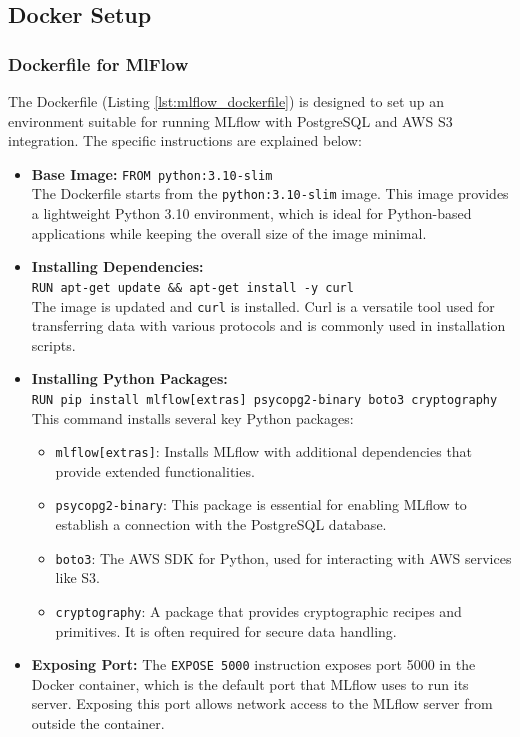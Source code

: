 \subsection{Docker Setup}
\subsubsection{Dockerfile for MlFlow}
The Dockerfile (Listing \ref{lst:mlflow_dockerfile}) is designed to set up an environment suitable for running MLflow with PostgreSQL and AWS S3 integration. The specific instructions are explained below:

\begin{itemize}
    \item \textbf{Base Image:} \verb|FROM python:3.10-slim| \\
    The Dockerfile starts from the \verb|python:3.10-slim| image. This image provides a lightweight Python 3.10 environment, which is ideal for Python-based applications while keeping the overall size of the image minimal.

    \item \textbf{Installing Dependencies:} \\
    \verb|RUN apt-get update && apt-get install -y curl| \\
    The image is updated and \verb|curl| is installed. Curl is a versatile tool used for transferring data with various protocols and is commonly used in installation scripts.

    \item \textbf{Installing Python Packages:} \\
    \verb|RUN pip install mlflow[extras] psycopg2-binary boto3 cryptography| \\
    This command installs several key Python packages:
    \begin{itemize}
        \item \verb|mlflow[extras]|: Installs MLflow with additional dependencies that provide extended functionalities.
        \item \verb|psycopg2-binary|: This package is essential for enabling MLflow to establish a connection with the PostgreSQL database. 
        \item \verb|boto3|: The AWS SDK for Python, used for interacting with AWS services like S3.
        \item \verb|cryptography|: A package that provides cryptographic recipes and primitives. It is often required for secure data handling.
    \end{itemize}

    \item \textbf{Exposing Port:} The \verb|EXPOSE 5000| instruction exposes port 5000 in the Docker container, which is the default port that MLflow uses to run its server. Exposing this port allows network access to the MLflow server from outside the container.
\end{itemize}

